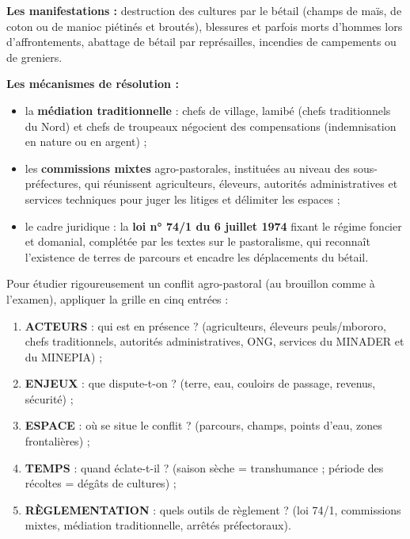 \documentclass[11pt]{article}
\begin{document}
\textbf{Les manifestations :} destruction des cultures par le bétail (champs de maïs, de coton ou de manioc piétinés et broutés), blessures et parfois morts d'hommes lors d'affrontements, abattage de bétail par représailles, incendies de campements ou de greniers.

\textbf{Les mécanismes de résolution :}
\begin{itemize}
\item la \textbf{médiation traditionnelle} : chefs de village, lamibé (chefs traditionnels du Nord) et chefs de troupeaux négocient des compensations (indemnisation en nature ou en argent) ;
\item les \textbf{commissions mixtes} agro-pastorales, instituées au niveau des sous-préfectures, qui réunissent agriculteurs, éleveurs, autorités administratives et services techniques pour juger les litiges et délimiter les espaces ;
\item le cadre juridique : la \textbf{loi n° 74/1 du 6 juillet 1974} fixant le régime foncier et domanial, complétée par les textes sur le pastoralisme, qui reconnaît l'existence de terres de parcours et encadre les déplacements du bétail.
\end{itemize}

\begin{methode}
Pour étudier rigoureusement un conflit agro-pastoral (au brouillon comme à l'examen), appliquer la grille en cinq entrées :
\begin{enumerate}
\item \textbf{ACTEURS} : qui est en présence ? (agriculteurs, éleveurs peuls/mbororo, chefs traditionnels, autorités administratives, ONG, services du MINADER et du MINEPIA) ;
\item \textbf{ENJEUX} : que dispute-t-on ? (terre, eau, couloirs de passage, revenus, sécurité) ;
\item \textbf{ESPACE} : où se situe le conflit ? (parcours, champs, points d'eau, zones frontalières) ;
\item \textbf{TEMPS} : quand éclate-t-il ? (saison sèche = transhumance ; période des récoltes = dégâts de cultures) ;
\item \textbf{RÈGLEMENTATION} : quels outils de règlement ? (loi 74/1, commissions mixtes, médiation traditionnelle, arrêtés préfectoraux).
\end{enumerate}
\end{methode}
\end{document}
